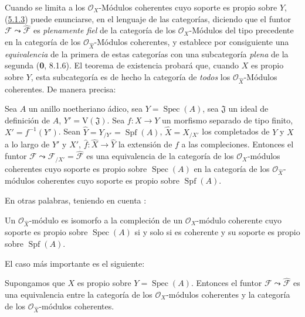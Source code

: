 Cuando se limita a los $\mathcal O_X$-Módulos coherentes cuyo soporte es propio
sobre $Y$, (\hyperref[III.5.1.3-fr]{5.1.3}) puede enunciarse, en el lenguaje de las
categorías, diciendo que el funtor
$\mathcal F\leadsto\widehat{\mathcal F}$ es \emph{plenamente fiel} de la categoría de los
$\mathcal O_X$-Módulos del tipo precedente en la categoría de los
$\mathcal O_{\widehat X}$-Módulos coherentes, y establece por consiguiente una \emph{equivalencia} de
la primera de estas categorías con una subcategoría \emph{plena} de la segunda
(\textbf{0}, 8.1.6). El teorema de existencia probará que, cuando $X$ es propio sobre $Y$,
esta subcategoría es de hecho la categoría de \emph{todos} los
$\mathcal O_{\widehat X}$-Módulos coherentes. De manera precisa:

\begin{theorem}[5.1.4]
\label{III.5.1.4}
\label{III.5.1.4-fr}
Sea $A$ un anillo noetheriano ádico, sea $Y=\operatorname{Spec}(A)$, sea
$\mathfrak J$ un ideal de definición de $A$, $Y'=\mathrm V(\mathfrak J)$. Sea $f:X\to Y$ un morfismo separado de tipo finito, $X'=f^{-1}(Y')$. Sean
$\widehat Y=Y_{/Y'}=\operatorname{Spf}(A)$, $\widehat X=X_{/X'}$ los completados de
$Y$ y $X$ a lo largo de $Y'$ y $X'$, $\widehat f:\widehat X\to\widehat Y$ la extensión de $f$ a
las compleciones. Entonces el funtor
$\mathcal F\leadsto\mathcal F_{/X'}=\widehat{\mathcal F}$
es una equivalencia de la categoría de los
$\mathcal O_X$-módulos coherentes cuyo soporte es propio sobre $\operatorname{Spec}(A)$ en la
categoría de los $\mathcal O_{\widehat X}$-módulos coherentes cuyo soporte
es propio sobre $\operatorname{Spf}(A)$.
\end{theorem}

En otras palabras, teniendo en cuenta :

\begin{corollary}[5.1.5]
\label{III.5.1.5}
\label{III.5.1.5-fr}
Un $\mathcal O_{\widehat X}$-módulo es isomorfo a la compleción de
un $\mathcal O_X$-módulo coherente cuyo soporte es propio sobre
$\operatorname{Spec}(A)$ si y solo si es coherente y su soporte es propio
sobre $\operatorname{Spf}(A)$.
\end{corollary}

El caso más importante es el siguiente:

\begin{corollary}[5.1.6]
\label{III.5.1.6}
\label{III.5.1.6-fr}
Supongamos que $X$ es propio sobre $Y=\operatorname{Spec}(A)$. Entonces el funtor
$\mathcal F\leadsto\widehat{\mathcal F}$ es una equivalencia entre la
categoría de los $\mathcal O_X$-módulos coherentes y la categoría de los
$\mathcal O_{\widehat X}$-módulos coherentes.
\end{corollary}

